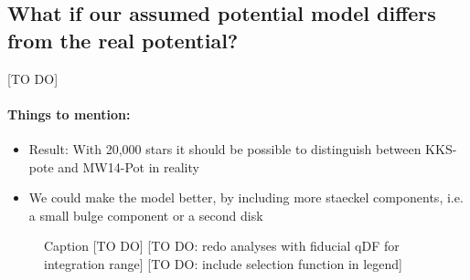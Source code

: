 \subsection{What if our assumed potential model differs from the real potential?}

[TO DO]

\paragraph{Things to mention:}
\begin{itemize}
\item Result: With 20,000 stars it should be possible to distinguish between KKS-pote and MW14-Pot in reality
\item We could make the model better, by including more staeckel components, i.e. a small bulge component or a second disk
\end{itemize}




\begin{figure}
\caption{Caption [TO DO] [TO DO: redo analyses with fiducial qDF for integration range] [TO DO: include selection function in legend]}
\end{figure}





